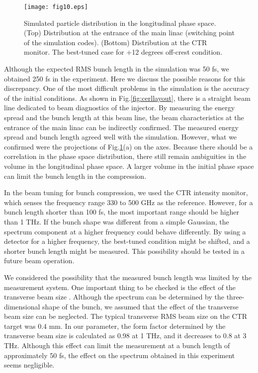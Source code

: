 \documentclass[review]{elsarticle}
\begin{document}
\begin{figure}[htb]
	\begin{center}
	 \texttt{[image: fig10.eps]}
	  \caption{
Simulated particle distribution in the longitudinal phase space.
(Top) Distribution at the entrance of the main linac 
(switching point of the simulation codes).
(Bottom) Distribution at the CTR monitor.
The best-tuned case for +12 degrees off-crest condition.
}
	\label{fig:simudistribution}
\end{center}
\end{figure}

Although the expected RMS bunch length in the
simulation was 50 fs,
we obtained 250 fs in the experiment.
Here we discuss the possible reasons for this discrepancy.
One of the most difficult problems in the simulation
is the accuracy of the initial conditions.
As shown in Fig.\ref{fig:cerllayout},
there is a straight beam line dedicated to beam diagnostics of the injector.
By measuring the energy spread and the bunch length at this beam line,
the beam characteristics at the entrance of the main linac
can be indirectly confirmed.
The measured energy spread and bunch length agreed well with the simulation.
However, 
what we confirmed were the projections
of Fig.\ref{fig:simudistribution}(a) on the axes.
Because there should be a correlation in the phase space distribution,
there still remain ambiguities in the volume in the longitudinal phase space.
A larger volume in the initial phase space can limit the bunch length in the compression.


In the beam tuning for bunch compression,
we used the CTR intensity monitor, which senses the frequency range 330 to 500 GHz
as the reference.
However, 
for a bunch length shorter than 100 fs,
the most important range should be higher than 1 THz.
If the bunch shape was different from a simple Gaussian,
the spectrum component at a higher frequency could behave differently.
By using a detector for a higher frequency,
the best-tuned condition might be shifted, and 
a shorter bunch length might be measured.
This possibility should be tested in a future beam operation.


We considered the possibility
that the measured bunch length was limited 
by the measurement system.
One important thing to be checked is the effect of the transverse beam size \cite{Lihn}.
Although the spectrum can be determined 
by the three-dimensional shape of the bunch,
we assumed that the effect of the transverse beam size can be neglected.
The typical transverse RMS beam size on the CTR target was 0.4 mm.
In our parameter,
the form factor determined by the transverse beam size
is calculated as 0.98 at 1 THz,
and it decreases to 0.8 at 3 THz.
Although this effect 
can limit the measurement at a bunch length of approximately 50 fs,
the effect on the spectrum obtained in this experiment
seems negligible.
\end{document}
